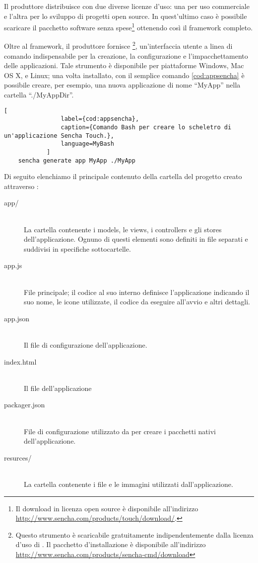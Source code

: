 			Il produttore distribuisce \senchat{} con due diverse licenze d'uso:
			una per uso commerciale e l'altra per lo sviluppo di progetti open 
			source. In quest'ultimo caso è possibile scaricare il pacchetto
			software senza spese\footnote{Il download in licenza open source è
			disponibile all'indirizzo \url{http://www.sencha.com/products/touch/download/}.}
			ottenendo così il framework completo.
			
			Oltre al framework, il produttore fornisce \senchacmd{}\footnote{
			Questo strumento è scaricabile gratuitamente indipendentemente dalla
			licenza d'uso di \senchat{}. Il pacchetto d'installazione è
			disponibile all'indirizzo \url{http://www.sencha.com/products/sencha-cmd/download}},
			un'interfaccia utente a linea di comando indispensabile per la
			creazione, la configurazione e l'impacchettamento delle applicazioni.
			Tale strumento è disponibile per piattaforme Windows, Mac OS X, e Linux;
			una volta installato, con il semplice comando \ref{cod:appsencha} è
			possibile creare, per esempio, una nuova applicazione di nome
			``MyApp'' nella cartella ``./MyAppDir''.
			\begin{lstlisting}[
				label={cod:appsencha},
				caption={Comando Bash per creare lo scheletro di un'applicazione Sencha Touch.},
				language=MyBash
			]
	sencha generate app MyApp ./MyApp
			\end{lstlisting}
			Di seguito elenchiamo il principale contenuto della cartella del
			progetto creato attraverso \senchacmd{}:
			\begin{description}
				\item[app/]\hfill \\
					La cartella contenente i models, le views, i controllers e
					gli stores dell'applicazione. Ognuno di questi elementi sono
					definiti in file \js{} separati e suddivisi in specifiche
					sottocartelle.
				\item[app.js]\hfill \\
					File \js{} principale; il codice al suo interno definisce
					l'applicazione indicando il suo nome, le icone utilizzate,
					il codice da eseguire all'avvio e altri	dettagli. 
				\item[app.json]\hfill \\
					Il file di configurazione dell'applicazione.
				\item[index.html]\hfill \\
					Il file \html{} dell'applicazione
				\item[packager.json]\hfill \\
					File di configurazione utilizzato da \senchacmd{} per creare
					i pacchetti nativi dell'applicazione.
				\item[resurces/]\hfill \\
					La cartella contenente i file \css{} e le immagini utilizzati
					dall'applicazione.
			\end{description}
